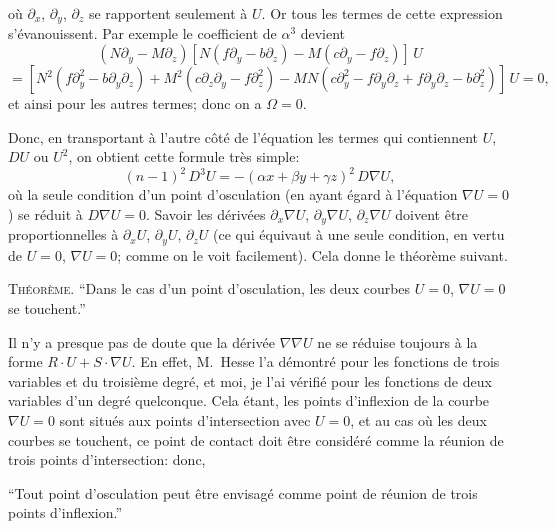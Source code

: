 \documentclass[11pt]{article}
\begin{document}
o\`u $\partial_{x}$, $\partial_{y}$, $\partial_{z}$ se rapportent seulement \`a $U$. Or tous les termes de cette expression
s'\'evanouissent. Par exemple le coefficient de $\alpha^{3}$ devient
\[
(N \partial_{y} - M \partial_{z})[N(f \partial_{y} - b \partial_{z}) - M(c \partial_{y} - f \partial_{z})]\,U
\]
\[
= [N^{2}(f \partial_{y}^{2} - b \partial_{y}\partial_{z}) + M^{2}(c \partial_{z}\partial_{y} - f \partial_{z}^{2}) - M N(c \partial_{y}^{2} - f \partial_{y}\partial_{z} + f \partial_{y}\partial_{z} - b \partial_{z}^{2})]\,U = 0,
\]
et ainsi pour les autres termes; donc on a $\Omega = 0$.

\medskip
Donc, en transportant \`a l'autre c\^ot\'e de l'\'equation les termes qui contiennent $U$,
$D U$ ou $U^{2}$, on obtient cette formule tr\`es simple:
\[
(n - 1)^{2}\,D^{3} U = -(\alpha x + \beta y + \gamma z)^{2}\,D \nabla U,
\]
o\`u la seule condition d'un point d'osculation (en ayant \'egard \`a l'\'equation $\nabla U = 0$) se
r\'eduit \`a $D \nabla U = 0$. Savoir les d\'eriv\'ees $\partial_{x}\nabla U$, $\partial_{y}\nabla U$, $\partial_{z}\nabla U$ doivent \^etre proportionnelles
\`a $\partial_{x} U$, $\partial_{y} U$, $\partial_{z} U$ (ce qui \'equivaut \`a une seule condition, en vertu de $U = 0$, $\nabla U = 0$;
comme on le voit facilement). Cela donne le th\'eor\`eme suivant.

\medskip
\noindent\textsc{Th\'eor\`eme.} ``Dans le cas d'un point d'osculation, les deux courbes $U = 0$, $\nabla U = 0$
se touchent.''

\medskip
Il n'y a presque pas de doute que la d\'eriv\'ee $\nabla\nabla U$ ne se r\'eduise toujours \`a la
forme $R \cdot U + S \cdot \nabla U$. En effet, M.~Hesse l'a d\'emontr\'e pour les fonctions de trois
variables et du troisi\`eme degr\'e, et moi, je l'ai v\'erifi\'e pour les fonctions de deux
variables d'un degr\'e quelconque. Cela \'etant, les points d'inflexion de la courbe $\nabla U = 0$
sont situ\'es aux points d'intersection avec $U = 0$, et au cas o\`u les deux courbes se
touchent, ce point de contact doit \^etre consid\'er\'e comme la r\'eunion de trois points
d'intersection: donc,

\smallskip
``Tout point d'osculation peut \^etre envisag\'e comme point de r\'eunion de trois points
d'inflexion.''
\end{document}
